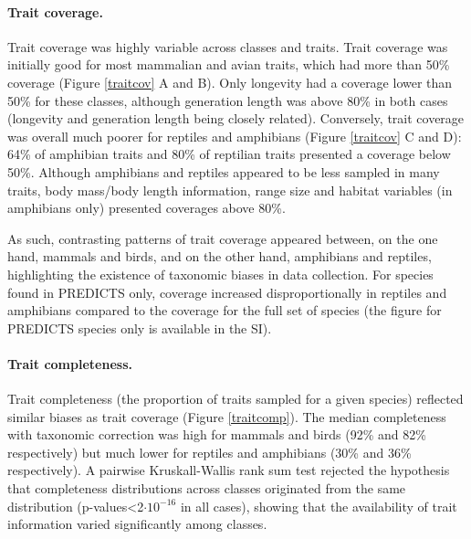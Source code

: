 \paragraph{Trait coverage.}
Trait coverage was highly variable across classes and traits. Trait coverage was initially good for most mammalian and avian traits, which had more than 50\% coverage (Figure \ref{traitcov} A and B). Only longevity had a coverage lower than 50\% for these classes, although generation length was above 80\% in both cases (longevity and generation length being closely related). Conversely, trait coverage was overall much poorer for reptiles and amphibians (Figure \ref{traitcov} C and D): 64\% of amphibian traits and 80\% of reptilian traits presented a coverage below 50\%.  
Although amphibians and reptiles appeared to be less sampled in many traits, body mass/body length information, range size and habitat variables (in amphibians only) presented coverages above 80\%.

As such, contrasting patterns of trait coverage appeared between, on the one hand, mammals and birds, and on the other hand, amphibians and reptiles, highlighting the existence of taxonomic biases in data collection. For species found in PREDICTS only, coverage increased disproportionally in reptiles and amphibians compared to the coverage for the full set of species (the figure for PREDICTS species only is available in the SI).

\paragraph{Trait completeness.}
Trait completeness (the proportion of traits sampled for a given species) reflected similar biases as trait coverage (Figure \ref{traitcomp}). The median completeness with taxonomic correction was high for mammals and birds (92\% and 82\% respectively) but much lower for reptiles and amphibians (30\% and 36\% respectively). A pairwise Kruskall-Wallis rank sum test rejected the hypothesis that completeness distributions across classes originated from the same distribution (p-values<2$\cdot10^{-16}$ in all cases), showing that the availability of trait information varied significantly among classes. 

